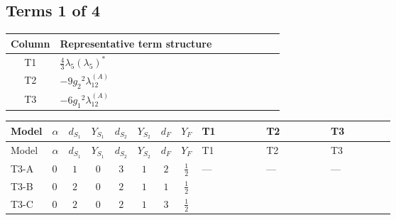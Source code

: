 \documentclass[8pt]{article}
\begin{document}
\begin{landscape}
\subsection*{Terms 1 of 4}
\begin{center}
\begin{tabular}{@{}c >{\raggedright\arraybackslash}p{0.82\linewidth}@{}}
\toprule
Column & Representative term structure \\
\midrule
T1 & \(\displaystyle \frac{4}{3} {\lambda_5} \left({\lambda_5}\right)^{*}\) \\
\midrule
T2 & \(\displaystyle -9 {g_2}^2 {\lambda_{12}^{(A)}}\) \\
\midrule
T3 & \(\displaystyle -6 {g_1}^2 {\lambda_{12}^{(A)}}\) \\
\midrule
\bottomrule
\end{tabular}
\end{center}
\smallskip
\tiny
\begin{longtable}{@{}llcccccc >{\raggedright\arraybackslash}p{0.21\linewidth} >{\raggedright\arraybackslash}p{0.21\linewidth} >{\raggedright\arraybackslash}p{0.21\linewidth}@{}}
\toprule
Model & $\alpha$ & $d_{S_1}$ & $Y_{S_1}$ & $d_{S_2}$ & $Y_{S_2}$ & $d_F$ & $Y_F$ & T1 & T2 & T3 \\
\midrule
\endfirsthead
\toprule
Model & $\alpha$ & $d_{S_1}$ & $Y_{S_1}$ & $d_{S_2}$ & $Y_{S_2}$ & $d_F$ & $Y_F$ & T1 & T2 & T3 \\
\midrule
\endhead
T3-A & $0$ & $1$ & $0$ & $3$ & $1$ & $2$ & $\frac{1}{2}$ & --- & --- & --- \\
\midrule
T3-B & $0$ & $2$ & $0$ & $2$ & $1$ & $1$ & $\frac{1}{2}$ & \scriptsize\adjustbox{max width=\linewidth}{$\begin{gathered} \frac{4}{3} {\lambda_5} \left({\lambda_5}\right)^{*}\end{gathered}$} & \scriptsize\adjustbox{max width=\linewidth}{$\begin{gathered} -9 {g_2}^2 {\lambda_{12}^{(A)}}\end{gathered}$} & \scriptsize\adjustbox{max width=\linewidth}{$\begin{gathered} -6 {g_1}^2 {\lambda_{12}^{(A)}}\end{gathered}$} \\
\midrule
T3-C & $0$ & $2$ & $0$ & $2$ & $1$ & $3$ & $\frac{1}{2}$ & \scriptsize\adjustbox{max width=\linewidth}{$\begin{gathered} \frac{4}{3} {\lambda_5} \left({\lambda_5}\right)^{*}\end{gathered}$} & \scriptsize\adjustbox{max width=\linewidth}{$\begin{gathered} -9 {g_2}^2 {\lambda_{12}^{(A)}}\end{gathered}$} & \scriptsize\adjustbox{max width=\linewidth}{$\begin{gathered} -6 {g_1}^2 {\lambda_{12}^{(A)}}\end{gathered}$} \\

\end{longtable}
\end{landscape}
\end{document}
